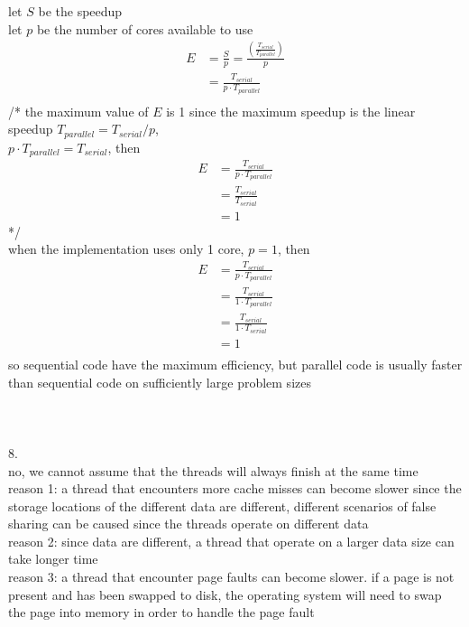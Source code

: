\documentclass[12pt,border=4pt,multi]{article}%
\begin{document}
let $S$ be the speedup\\
let $p$ be the number of cores available to use\\
{\large
\begin{align*}
E &= \frac{S}{p} = \frac{\left(\frac{T_{serial}}{T_{parallel}}\right)}{p}\\
&= \frac{T_{serial}}{p \cdot T_{parallel}}\\
\end{align*}}
/* the maximum value of $E$ is 1 since the maximum speedup is the linear speedup {\large $T_{parallel} = T_{serial} / p$,\\
$p \cdot T_{parallel} = T_{serial}$}, then
{\large
\begin{align*}
E &= \frac{T_{serial}}{p \cdot T_{parallel}}\\
&= \frac{T_{serial}}{T_{serial}}\\
&= 1
\end{align*}}
*/\\
when the implementation uses only 1 core, $p = 1$, then
{\large
\begin{align*}
E &= \frac{T_{serial}}{p \cdot T_{parallel}}\\  
&= \frac{T_{serial}}{1 \cdot T_{parallel}}\\
&= \frac{T_{serial}}{1 \cdot T_{serial}}\\ 
&= 1\\
\end{align*}}
so sequential code have the maximum efficiency, but parallel code is usually faster than sequential code on sufficiently large problem sizes\\
\\
\\
\\
8.\\
no, we cannot assume that the threads will always finish at the same time\\
reason 1: a thread that encounters more cache misses can become slower since the storage locations of the different data are different, different scenarios of false sharing can be caused since the threads operate on different data\\
reason 2: since data are different, a thread that operate on a larger data size can take longer time\\
reason 3: a thread that encounter page faults can become slower. if a page is not present and has been swapped to disk, the operating system will need to swap the page into memory in order to handle the page fault\\
\end{document}
